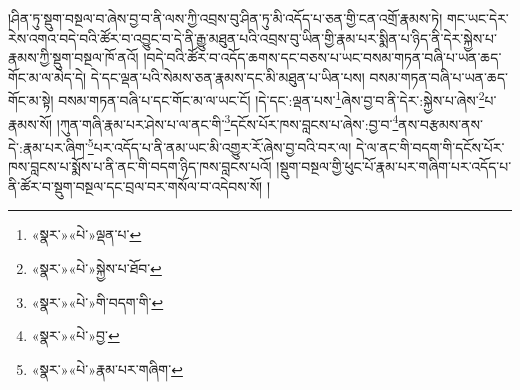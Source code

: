 །ཤིན་ཏུ་སྡུག་བསྔལ་བ་ཞེས་བྱ་བ་ནི་ལས་ཀྱི་འབྲས་བུ་ཤིན་ཏུ་མི་འདོད་པ་ཅན་གྱི་ངན་འགྲོ་རྣམས་ཏེ། གང་ཡང་དེར་རེས་འགའ་བདེ་བའི་ཚོར་བ་འབྱུང་བ་དེ་ནི་རྒྱུ་མཐུན་པའི་འབྲས་བུ་ཡིན་གྱི་རྣམ་པར་སྨིན་པ་ཉིད་ནི་དེར་སྐྱེས་པ་རྣམས་ཀྱི་སྡུག་བསྔལ་ཁོ་ནའོ། །བདེ་བའི་ཚོར་བ་འདོད་ཆགས་དང་བཅས་པ་ཡང་བསམ་གཏན་བཞི་པ་ཡན་ཆད་གོང་མ་ལ་མེད་དེ། དེ་དང་ལྡན་པའི་སེམས་ཅན་རྣམས་དང་མི་མཐུན་པ་ཡིན་པས། བསམ་གཏན་བཞི་པ་ཡན་ཆད་གོང་མ་སྟེ། བསམ་གཏན་བཞི་པ་དང་གོང་མ་ལ་ཡང་ངོ། །དེ་དང་:ལྡན་པས་\footnote{«སྣར་»«པེ་»ལྡན་པ་}ཞེས་བྱ་བ་ནི་དེར་:སྐྱེས་པ་ཞེས་\footnote{«སྣར་»«པེ་»སྐྱེས་པ་ཐོབ་}པ་རྣམས་སོ། །ཀུན་གཞི་རྣམ་པར་ཤེས་པ་ལ་ནང་གི་\footnote{«སྣར་»«པེ་»གི་བདག་གི་}དངོས་པོར་ཁས་བླངས་པ་ཞེས་:བྱ་བ་\footnote{«སྣར་»«པེ་»བྱ་}ནས་བརྩམས་ནས་དེ་:རྣམ་པར་ཞིག་\footnote{«སྣར་»«པེ་»རྣམ་པར་གཞིག་}པར་འདོད་པ་ནི་ནམ་ཡང་མི་འགྱུར་རོ་ཞེས་བྱ་བའི་བར་ལ། དེ་ལ་ནང་གི་བདག་གི་དངོས་པོར་ཁས་བླངས་པ་སྨོས་པ་ནི་ནང་གི་བདག་ཉིད་ཁས་བླངས་པའོ། །སྡུག་བསྔལ་གྱི་ཕུང་པོ་རྣམ་པར་གཞིག་པར་འདོད་པ་ནི་ཚོར་བ་སྡུག་བསྔལ་དང་བྲལ་བར་གསོལ་བ་འདེབས་སོ། །

